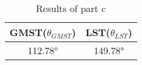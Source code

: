 \begin{table}[H]
    \caption{Results of part c}
    \begin{center}
        \begin{tabular}{|c|c|}
            \hline
            \Tstrut
            \textbf{GMST($\theta_{GMST}$)} & \textbf{LST($\theta_{LST}$)} \\
            \hline
            \ang{112.78} & \ang{149.78} \\
            \hline
            \end{tabular}
    \end{center}
\end{table}